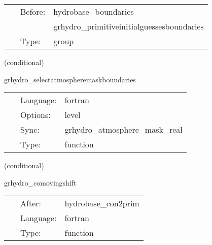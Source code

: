 \documentclass{article}
\begin{document}
\hspace{5mm}{\it apply boundary conditions to primitives } 


\hspace{5mm}

 \begin{tabular*}{160mm}{cll} 
~ & Before:  & hydrobase\_boundaries \\ 
~& ~ &grhydro\_primitiveinitialguessesboundaries\\ 
~ & Type:  & group \\ 
\end{tabular*} 


\vspace{5mm}

   (conditional) 

\hspace{5mm} grhydro\_selectatmospheremaskboundaries 

\hspace{5mm}{\it select atmosphere mask for boundary conditions } 


\hspace{5mm}

 \begin{tabular*}{160mm}{cll} 
~ & Language:  & fortran \\ 
~ & Options:  & level \\ 
~ & Sync:  & grhydro\_atmosphere\_mask\_real \\ 
~ & Type:  & function \\ 
\end{tabular*} 


\vspace{5mm}

   (conditional) 

\hspace{5mm} grhydro\_comovingshift 

\hspace{5mm}{\it comoving shift } 


\hspace{5mm}

 \begin{tabular*}{160mm}{cll} 
~ & After:  & hydrobase\_con2prim \\ 
~ & Language:  & fortran \\ 
~ & Type:  & function \\ 
\end{tabular*} 


\vspace{5mm}
\end{document}
